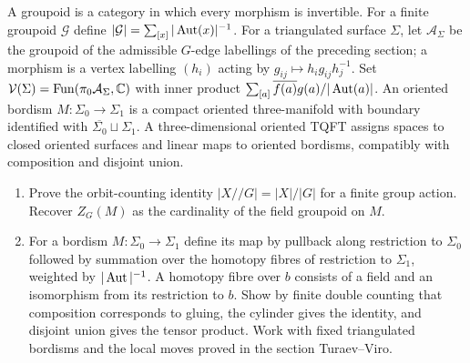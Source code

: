 \begin{exercise}
A groupoid is a category in which every morphism is invertible.
For a finite groupoid $\mathcal G$ define
$|\mathcal G|=\sum_{[x]}|\operatorname{Aut}(x)|^{-1}$. For a triangulated
surface $\Sigma$, let $\mathcal A_\Sigma$ be the groupoid of
the admissible $G$-edge labellings of the preceding section;
a morphism is a vertex labelling $(h_i)$ acting by
$g_{ij}\mapsto h_i g_{ij}h_j^{-1}$. Set
$\mathcal V(\Sigma)=\operatorname{Fun}(\pi_0\mathcal A_\Sigma,\mathbb C)$ with inner product
$\sum_{[a]}\overline{f(a)}g(a)/|\operatorname{Aut}(a)|$.
An oriented bordism $M:\Sigma_0\to\Sigma_1$ is a compact
oriented three-manifold with boundary identified with
$\overline{\Sigma_0}\sqcup\Sigma_1$.
A three-dimensional oriented TQFT assigns spaces to closed oriented
surfaces and linear maps to oriented bordisms, compatibly with
composition and disjoint union.
\begin{enumerate}[label=(\alph*)]
\item Prove the orbit-counting identity
$|X//G|=|X|/|G|$ for a finite group action.
Recover $Z_G(M)$ as the cardinality of the field groupoid on $M$.
\item For a bordism $M:\Sigma_0\to\Sigma_1$ define its map by
pullback along restriction to $\Sigma_0$ followed by summation over
the homotopy fibres of restriction to $\Sigma_1$, weighted by
$|\operatorname{Aut}|^{-1}$. A homotopy fibre over $b$ consists of a field
and an isomorphism from its restriction to $b$.
Show by finite double counting that composition corresponds to
gluing, the cylinder gives the identity, and disjoint union gives
the tensor product. Work with fixed triangulated bordisms and the
local moves proved in the section Turaev--Viro.
\end{enumerate}
\end{exercise}


